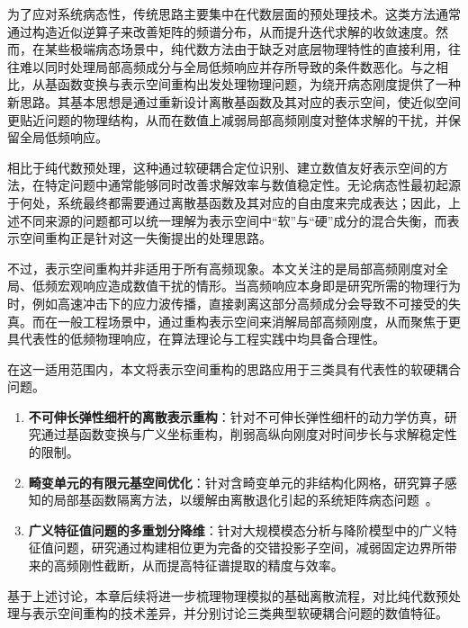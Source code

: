 为了应对系统病态性，传统思路主要集中在代数层面的预处理技术。这类方法通常通过构造近似逆算子来改善矩阵的频谱分布，从而提升迭代求解的收敛速度。然而，在某些极端病态场景中，纯代数方法由于缺乏对底层物理特性的直接利用，往往难以同时处理局部高频成分与全局低频响应并存所导致的条件数恶化。与之相比，从基函数变换与表示空间重构出发处理物理问题，为绕开病态刚度提供了一种新思路。其基本思想是通过重新设计离散基函数及其对应的表示空间，使近似空间更贴近问题的物理结构，从而在数值上减弱局部高频刚度对整体求解的干扰，并保留全局低频响应。

相比于纯代数预处理，这种通过软硬耦合定位识别、建立数值友好表示空间的方法，在特定问题中通常能够同时改善求解效率与数值稳定性。无论病态性最初起源于何处，系统最终都需要通过离散基函数及其对应的自由度来完成表达；因此，上述不同来源的问题都可以统一理解为表示空间中“软”与“硬”成分的混合失衡，而表示空间重构正是针对这一失衡提出的处理思路。

不过，表示空间重构并非适用于所有高频现象。本文关注的是局部高频刚度对全局、低频宏观响应造成数值干扰的情形。当高频响应本身即是研究所需的物理行为时，例如高速冲击下的应力波传播，直接剥离这部分高频成分会导致不可接受的失真。而在一般工程场景中，通过重构表示空间来消解局部高频刚度，从而聚焦于更具代表性的低频物理响应，在算法理论与工程实践中均具备合理性。

    在这一适用范围内，本文将表示空间重构的思路应用于三类具有代表性的软硬耦合问题。
    \begin{enumerate}
    \item \textbf{不可伸长弹性细杆的离散表示重构}：针对不可伸长弹性细杆的动力学仿真，研究通过基函数变换与广义坐标重构，削弱高纵向刚度对时间步长与求解稳定性的限制。
    \item \textbf{畸变单元的有限元基空间优化}：针对含畸变单元的非结构化网格，研究算子感知的局部基函数隔离方法，以缓解由离散退化引起的系统矩阵病态问题~\cite{Shewchuk2002whatIsAGoodLinearFiniteElement}。
    \item \textbf{广义特征值问题的多重划分降维}：针对大规模模态分析与降阶模型中的广义特征值问题，研究通过构建相位更为完备的交错投影子空间，减弱固定边界所带来的高频刚性截断，从而提高特征谱提取的精度与效率。
\end{enumerate}

基于上述讨论，本章后续将进一步梳理物理模拟的基础离散流程，对比纯代数预处理与表示空间重构的技术差异，并分别讨论三类典型软硬耦合问题的数值特征。